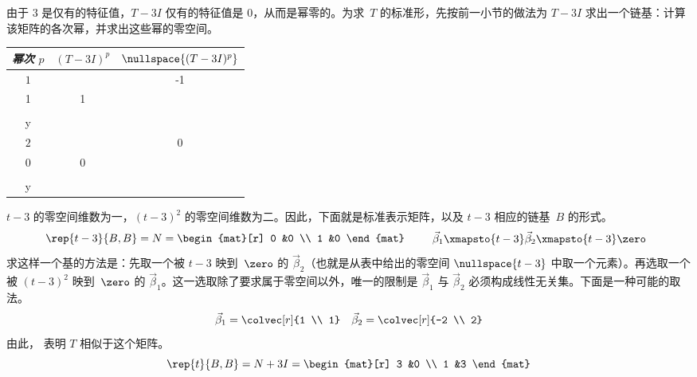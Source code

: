 \begin{example}
由于 $3$ 是仅有的特征值，$T-3I$ 仅有的特征值是 \( 0 \)，从而是幂零的。为求~$T$ 的标准形，先按前一小节的做法为 $T-3I$ 求出一个链基：计算该矩阵的各次幂，并求出这些幂的零空间。
\begin{center}
  \begin{tabular}{c|cc}
    \multicolumn{1}{c}{\textit{幂次} \( p \)}  &\( (T-3I)^p \)  &\( \nullspace{(T-3I)^p}  \)   \\
    \hline
    \( 1 \)
    &\(
       \matrixvenlarge{\begin{mat}[r]
         -1  &-1 \\
         1   &1   \\
       \end{mat}}  \)
    &\( \set{\matrixvenlarge{\colvec{-y \\ y}}\suchthat
                               y\in\C}  \)   \\
    \( 2 \)
    &\(
       \matrixvenlarge{\begin{mat}[r]
         0  &0  \\
         0  &0   \\
       \end{mat}}  \)
    &\( \set{\matrixvenlarge{\colvec{x \\ y}}\suchthat
                               x,y\in\C}  \)   \\
  \end{tabular}
\end{center}
$t-3$ 的零空间维数为一，$(t-3)^2$ 的零空间维数为二。因此，下面就是标准表示矩阵，以及 $t-3$ 相应的链基~$B$ 的形式。
\begin{equation*}
  \rep{t-3}{B,B}
  =N=
  \begin{mat}[r]
      0  &0   \\
      1  &0
  \end{mat}
  \qquad
  \begin{array}{r}
    \vec{\beta}_1\xmapsto{t-3}\vec{\beta}_2\xmapsto{t-3}\zero  \\
  \end{array}
\end{equation*}
求这样一个基的方法是：先取一个被 $t-3$ 映到~$\zero$ 的 $\vec{\beta}_2$（也就是从表中给出的零空间 $\nullspace{t-3}$ 中取一个元素）。再选取一个被 $(t-3)^2$ 映到~$\zero$ 的 $\vec{\beta}_1$。这一选取除了要求属于零空间以外，唯一的限制是 $\vec{\beta}_1$ 与 $\vec{\beta}_2$ 必须构成线性无关集。下面是一种可能的取法。
\begin{equation*}
  \vec{\beta}_1=\colvec[r]{1 \\ 1}
  \quad
  \vec{\beta}_2=\colvec[r]{-2 \\ 2}
\end{equation*}
由此， 表明 \( T \) 相似于这个矩阵。
\begin{equation*}
  \rep{t}{B,B}=
  N+3I=
  \begin{mat}[r]
     3  &0  \\
     1  &3
  \end{mat}
\end{equation*}


\end{example}
